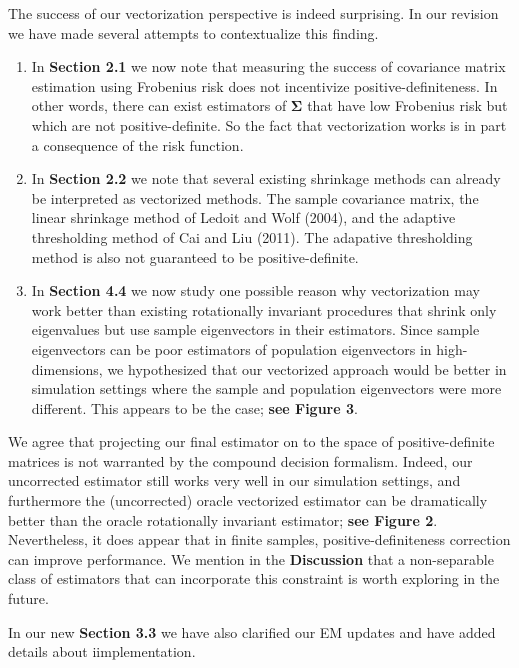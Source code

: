 \documentclass[12pt]{article}
\def\bs{\boldsymbol}
\begin{document}
\begin{enumerate}
  The success of our vectorization perspective is indeed surprising. In our revision we have made several attempts to contextualize this finding.
  \begin{enumerate}

  \item In \textbf{Section 2.1} we now note that measuring the success of covariance matrix estimation using Frobenius risk does not incentivize positive-definiteness. In other words, there can exist estimators of $\bs{\Sigma}$ that have low Frobenius risk but which are not positive-definite. So the fact that vectorization works is in part a consequence of the risk function.

  \item In \textbf{Section 2.2} we note that several existing shrinkage methods can already be interpreted as vectorized methods. The sample covariance matrix, the linear shrinkage method of Ledoit and Wolf (2004), and the adaptive thresholding method of Cai and Liu (2011). The adapative thresholding method is also not guaranteed to be positive-definite.

  \item In \textbf{Section 4.4} we now study one possible reason why vectorization may work better than existing rotationally invariant procedures that shrink only eigenvalues but use sample eigenvectors in their estimators. Since sample eigenvectors can be poor estimators of population eigenvectors in high-dimensions, we hypothesized that our vectorized approach would be better in simulation settings where the sample and population eigenvectors were more different. This appears to be the case; \textbf{see Figure 3}.
  \end{enumerate}

  We agree that projecting our final estimator on to the space of positive-definite matrices is not warranted by the compound decision formalism. Indeed, our uncorrected estimator still works very well in our simulation settings, and furthermore the (uncorrected) oracle vectorized estimator can be dramatically better than the oracle rotationally invariant estimator; \textbf{see Figure 2}. Nevertheless, it does appear that in finite samples, positive-definiteness correction can improve performance. We mention in the \textbf{Discussion} that a non-separable class of estimators that can incorporate this constraint is worth exploring in the future.

  In our new \textbf{Section 3.3} we have also clarified our EM updates and have added details about iimplementation.


\end{enumerate}
\end{document}
